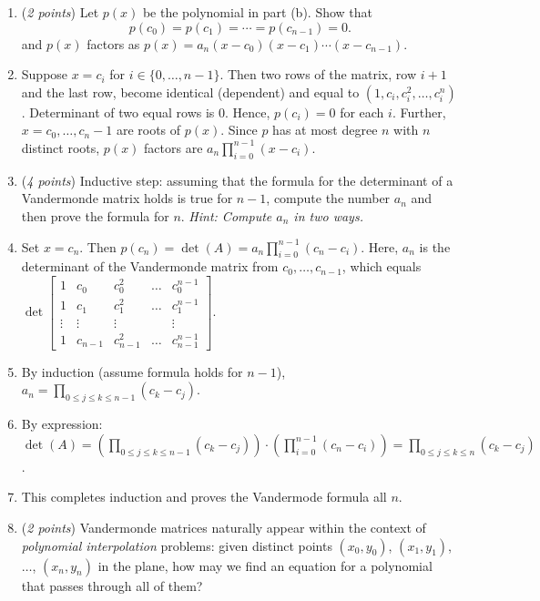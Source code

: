 \documentclass[11pt]{article}
\theoremstyle{definition}
\numberwithin{equation}{subsection}
\begin{document}
\begin{enumerate}
\begin{enumerate}
\item (\emph{2 points}) Let $p(x)$ be the polynomial in part (b). Show that
$$p(c_0)=p(c_1)=\cdots=p(c_{n-1})=0.$$
and $p(x)$ factors as $p(x)=a_n(x-c_0)(x-c_1)\cdots(x-c_{n-1})$.
\item[] Suppose $x=c_i$ for $i\in\{0,\ldots,n-1\}$. Then two rows of the matrix, row $i+1$ and the last row, become identical (dependent) and equal to $(1,c_i,c_i^2,\ldots,c_i^n)$. Determinant of two equal rows is 0. Hence, $p(c_i)=0$ for each $i$. Further, $x=c_0,\ldots,c_n-1$ are roots of $p(x)$. Since $p$ has at most degree $n$ with $n$ distinct roots, $p(x)$ factors are $a_n\prod^{n-1}_{i=0}(x-c_i)$.

\item (\emph{4 points}) Inductive step: assuming that the formula for the determinant of a Vandermonde matrix holds is true for $n-1$, compute the number $a_n$ and then prove the formula for $n$. \emph{Hint: Compute $a_n$ in two ways.}
\item[] Set $x=c_n$. Then $p(c_n)=\det(A)=a_n\prod^{n-1}_{i=0}(c_n-c_i)$. Here, $a_n$ is the determinant of the Vandermonde matrix from $c_0,\ldots,c_{n-1}$, which equals $\det\begin{bmatrix}
    1&c_0&c_0^2&\ldots&c_0^{n-1}\\1&c_1&c_1^2&\ldots&c_1^{n-1}\\ \vdots&\vdots&\vdots&&\vdots\\1&c_{n-1}&c_{n-1}^2&\ldots&c_{n-1}^{n-1}
\end{bmatrix}.$ 
\item[] By induction (assume formula holds for $n-1$), $a_n=\prod_{0\leq j\leq k\leq n-1}(c_k-c_j)$. 
\item[] By expression: $\det(A)=(\prod_{0\leq j\leq k\leq n-1}(c_k-c_j))\cdot(\prod^{n-1}_{i=0}(c_n-c_i))=\prod_{0\leq j\leq k\leq n}(c_k-c_j)$.
\item[] This completes induction and proves the Vandermode formula all $n$.

\item (\emph{2 points}) Vandermonde matrices naturally appear within the context of \emph{polynomial interpolation} problems: given distinct points $(x_0, y_0)$, $(x_1, y_1)$, $\dots$, $(x_n, y_n)$ in the plane, how may we find an equation for a polynomial that passes through all of them?

\medskip


\end{enumerate}
\end{enumerate}
\end{document}
